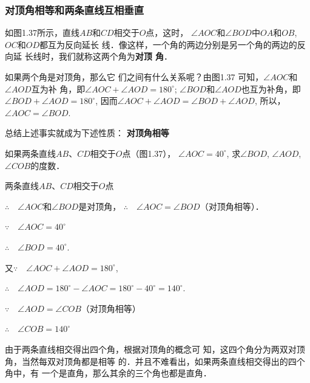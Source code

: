 \subsubsection{对顶角相等和两条直线互相垂直}

如图1.37所示，直线$AB$和$CD$相交于$O$点，这时，
$\angle AOC$和$\angle BOD$中$OA$和$OB$, $OC$和$OD$都互为反向延长
线．像这样，一个角的两边分别是另一个角的两边的反向延
长线时，我们就称这两个角为\textbf{对顶
角}．

如果两个角是对顶角，那么它
们之间有什么关系呢？由图1.37
可知，$\angle AOC$和$\angle AOD$互为补
角，即$\angle AOC+\angle AOD=180^{\circ}$;
$\angle BOD$和$\angle AOD$也互为补角，即$\angle BOD+\angle AOD=180^{\circ}$,
因而$\angle AOC+\angle AOD=\angle BOD+\angle AOD$, 所以，$\angle AOC=\angle BOD$.

总结上述事实就成为下述性质：
\textbf{对顶角相等}

\begin{example}
	如果两条直线$AB$、$CD$相交于$O$点（图1.37），
$\angle AOC=40^{\circ}$, 求$\angle BOD$, $\angle AOD$, $\angle COB$的度数．
\end{example}

\begin{figure}[htp]
	\centering
{}
	\caption{}
\end{figure}

\begin{solution}
	两条直线$AB$、$CD$相交于$O$点

$\therefore\quad \angle AOC$和$\angle BOD$是对顶角，
$\therefore\quad \angle AOC=\angle BOD$（对顶角相等）．

$\because\quad \angle AOC=40^{\circ}$

$\therefore\quad \angle BOD=40^{\circ}$.

又$\because\quad \angle AOC+\angle AOD=180^{\circ}$,

$\therefore\quad \angle AOD=180^{\circ}-\angle AOC=180^{\circ}-40^{\circ}=140^{\circ}$.

$\because\quad \angle AOD=\angle COB$（对顶角相等）

$\therefore\quad \angle COB=140^{\circ}$
\end{solution}


由于两条直线相交得出四个角，根据对顶角的概念可
知，这四个角分为两双对顶角，当然每双对顶角都是相等
的．并且不难看出，如果两条直线相交得出的四个角中，有
一个是直角，那么其余的三个角也都是直角．

